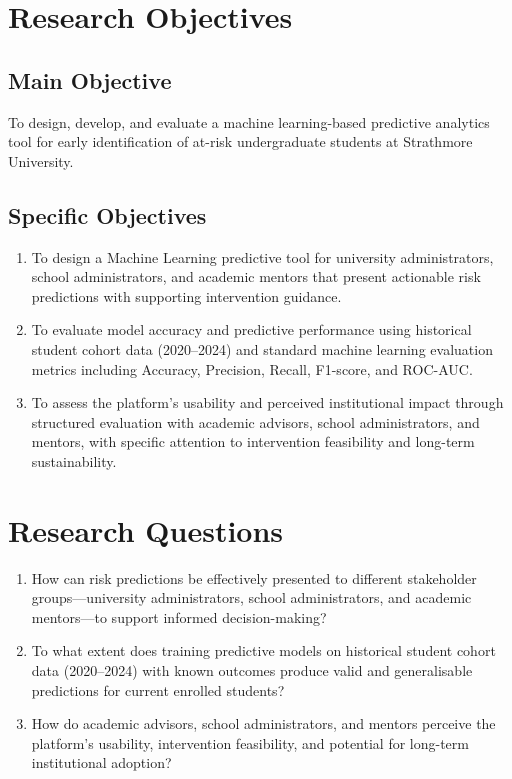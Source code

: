 \documentclass[12pt]{report}
\begin{document}
\section{Research Objectives}
\subsection{Main Objective}
To design, develop, and evaluate a machine learning-based predictive analytics tool for early identification of at-risk undergraduate students at Strathmore University.

\subsection{Specific Objectives}
\begin{enumerate}
    \item To design a Machine Learning predictive tool for university administrators, school administrators, and academic mentors that present actionable risk predictions with supporting intervention guidance.
    \item To evaluate model accuracy and predictive performance using historical student cohort data (2020--2024) and standard machine learning evaluation metrics including Accuracy, Precision, Recall, F1-score, and ROC-AUC.
    \item To assess the platform's usability and perceived institutional impact through structured evaluation with academic advisors, school administrators, and mentors, with specific attention to intervention feasibility and long-term sustainability.
\end{enumerate}

\section{Research Questions}
\begin{enumerate}
    \item How can risk predictions be effectively presented to different stakeholder groups---university administrators, school administrators, and academic mentors---to support informed decision-making?
    \item To what extent does training predictive models on historical student cohort data (2020--2024) with known outcomes produce valid and generalisable predictions for current enrolled students?
    \item How do academic advisors, school administrators, and mentors perceive the platform's usability, intervention feasibility, and potential for long-term institutional adoption?
\end{enumerate}
\end{document}
